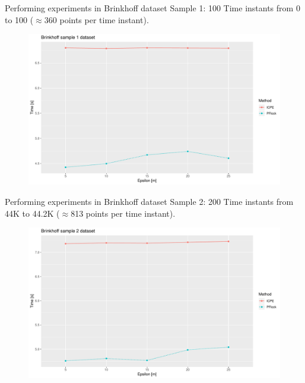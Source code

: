 \documentclass{beamer}
\begin{document}
\begin{frame}{Performing experiments in Brinkhoff dataset}
    {\small Sample 1: 100 Time instants from 0 to 100 ($\approx$360 points per time instant).}
    \centering
    \begin{figure}
        \includegraphics[width=.9\textwidth]{ICPE_B0-1K}
    \end{figure}    
\end{frame}

\begin{frame}{Performing experiments in Brinkhoff dataset}
    {\small Sample 2: 200 Time instants from 44K to 44.2K ($\approx$813 points per time instant).}
    \centering
    \begin{figure}
        \includegraphics[width=.9\textwidth]{ICPE_B43K-44K}
    \end{figure}    
\end{frame}
\end{document}
